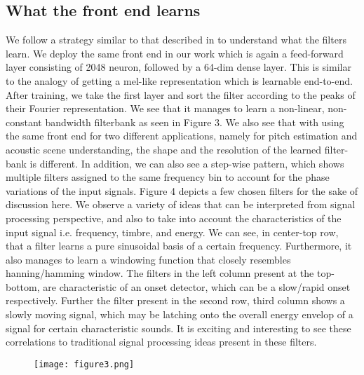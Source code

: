 \documentclass{article}
\begin{document}
\begin{sloppy}
\subsection{What the front end learns} We follow a strategy similar to that described in \cite{verma2016frequency} to understand what the filters learn. We deploy the same front end in our work which is again a feed-forward layer consisting of 2048 neuron, followed by a 64-dim dense layer. This is similar to the analogy of getting a mel-like representation which is learnable end-to-end. After training, we take the first layer and sort the filter according to the peaks of their Fourier representation. We see that it manages to learn a non-linear, non-constant bandwidth filterbank as seen in Figure 3. We also see that with using the same front end for two different applications, namely for pitch estimation and acoustic scene understanding, the shape and the resolution of the learned filter-bank is different. In addition, we can also see a step-wise pattern, which shows multiple filters assigned to the same frequency bin to account for the phase variations of the input signals. Figure 4 depicts a few chosen filters for the sake of discussion here. We observe a variety of ideas that can be interpreted from signal processing perspective, and also to take into account the characteristics of the input signal i.e. frequency, timbre, and energy. We can see,  in center-top row, that a filter learns a pure sinusoidal basis of a certain frequency. Furthermore, it also manages to learn a windowing function that closely resembles hanning/hamming window.  The filters in the left column present at the top-bottom, are characteristic of an onset detector, which can be a slow/rapid onset respectively.  Further the filter present in the second row, third column shows a slowly moving signal, which may be latching onto the overall energy envelop of a signal for certain characteristic sounds. It is exciting and interesting to see these correlations to traditional signal processing ideas present in these filters. 

\begin{figure}[h]
\centering
\texttt{[image: figure3.png]}
\end{figure}

\end{sloppy}
\end{document}
